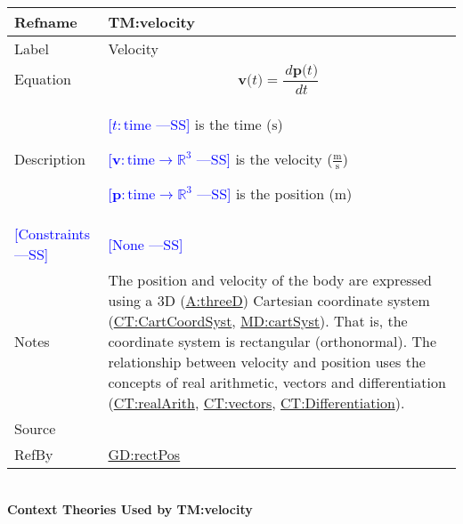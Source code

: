 \documentclass[12pt]{article}
\newcommand{\authornote}[3]{\textcolor{#1}{[#3 ---#2]}}
\newcommand{\authornote}[3]{}
\newcommand{\wss}[1]{\authornote{blue}{SS}{#1}}
\begin{document}
\medskip
\noindent
\begin{minipage}{\textwidth}
\begin{tabular}{>{\raggedright}p{}>{\raggedright\arraybackslash}p{}}
\toprule \textbf{Refname} & \textbf{TM:velocity}
\label{TM:velocity}
\\ \midrule
Label & Velocity
        
\\ \midrule
Equation & \begin{displaymath}
           \symbf{v}\text{(}t\text{)}=\frac{\,d\symbf{p}\text{(}t\text{)}}{\,dt}
           \end{displaymath}
\\ \midrule
Description & \begin{symbDescription}
              \item{\wss{$t: \text{time}$} is the time (${\text{s}}$)}
              \item{\wss{$\symbf{v}: \text{time} \rightarrow \mathbb{R}^3$} is the velocity ($\frac{\text{m}}{\text{s}}$)}
              \item{\wss{$\symbf{p}: \text{time} \rightarrow \mathbb{R}^3$} is the position (${\text{m}}$)}
              \end{symbDescription}
\\ \midrule
\wss{Constraints} & \wss{None}

\\ \midrule
Notes & The position and velocity of the body are expressed using a 3D (\hyperref[threeD]{A:threeD}) Cartesian
coordinate system (\hyperref[CT:CartCoordSyst]{CT:CartCoordSyst},
\hyperref[MD:cartSyst]{MD:cartSyst}).  That is, the coordinate system is rectangular
(orthonormal).  The relationship between velocity and position uses the concepts
of real arithmetic, vectors and differentiation
(\hyperref[CT:realArith]{CT:realArith}, \hyperref[CT:vectors]{CT:vectors},
\hyperref[CT:Differentiation]{CT:Differentiation}).

\\ \midrule
Source & \cite{velocityWiki}
         
\\ \midrule
RefBy & \hyperref[GD:rectPos]{GD:rectPos}
        
\\ \bottomrule
\end{tabular}
\end{minipage}
~\\
\noindent \textbf{Context Theories Used by TM:velocity}
\end{document}
